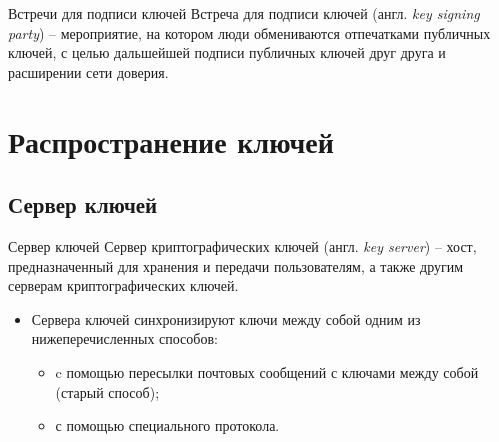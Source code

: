 \documentclass[presentation]{beamer}
\begin{document}
\begin{frame}{Встречи для подписи ключей}
  \raisebox{-.30em}{\Large\HandRight}\hspace{.25em} Встреча для
  подписи ключей (англ. \emph{key signing party}) -- мероприятие, на
  котором люди обмениваются отпечатками публичных ключей, с целью
  дальшейшей подписи публичных ключей друг друга и расширении сети
  доверия.
\end{frame}



\section{Распространение ключей}

\subsection{Сервер ключей}

\begin{frame}[fragile]{Сервер ключей}
  \raisebox{-.30em}{\Large\HandRight}\hspace{.25em} Сервер
  криптографических ключей (англ. \emph{key server}) -- хост,
  предназначенный для хранения и передачи пользователям, а также
  другим серверам криптографических ключей.
  \vspace{5 mm}
  \begin{itemize}
  \item Сервера ключей синхронизируют ключи между собой одним из
    нижеперечисленных способов:
    \begin{itemize}
    \item c помощью пересылки почтовых сообщений с ключами между собой
      (старый способ);
    \item с помощью специального протокола.
    \end{itemize}
  \end{itemize}
\end{frame}
\end{document}
